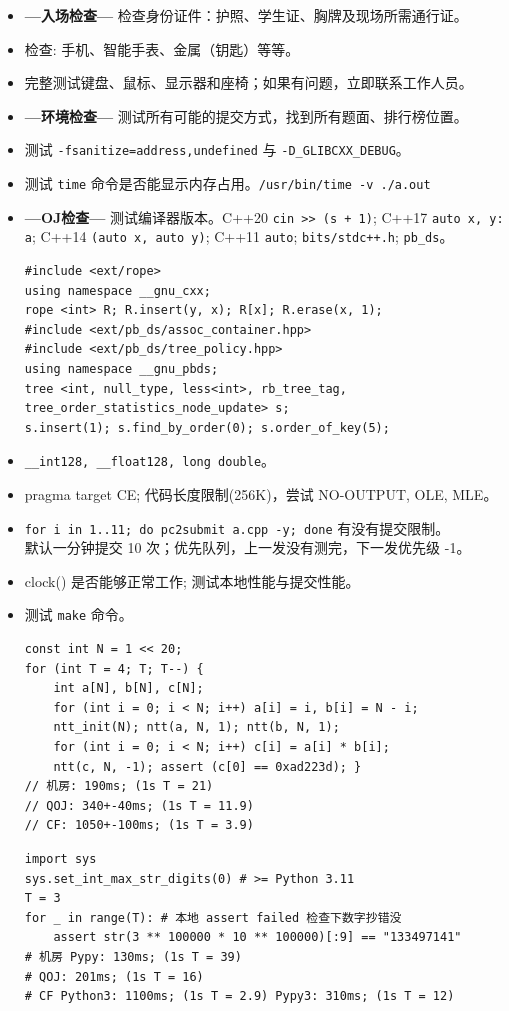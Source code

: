 \begin{itemize}[leftmargin=0.5mm]
	\setlength{\itemsep}{0pt}
	\setlength{\parskip}{0.5pt}
	\item \textbf{\large ---入场检查---} 检查身份证件：护照、学生证、胸牌及现场所需通行证。
	\item 检查: 手机、智能手表、金属（钥匙）等等。
	\item 完整测试键盘、鼠标、显示器和座椅；如果有问题，立即联系工作人员。
	\item \textbf{\large ---环境检查---} 测试所有可能的提交方式，找到所有题面、排行榜位置。
	\item 测试 \texttt{-fsanitize=address,undefined} 与 \texttt{-D\_GLIBCXX\_DEBUG}。
	\item 测试 \texttt{time} 命令是否能显示内存占用。\texttt{/usr/bin/time -v ./a.out}
	\item \textbf{\large ---OJ检查---} 测试编译器版本。C++20 \texttt{cin >> (s + 1)}; C++17 \texttt{auto \lbrack x, y\rbrack : a}; C++14 \texttt{\lbrack \rbrack (auto x, auto y)}; C++11 \texttt{auto}; \texttt{bits/stdc++.h}; \texttt{pb\_ds}。
\begin{verbatim}
#include <ext/rope>
using namespace __gnu_cxx;
rope <int> R; R.insert(y, x); R[x]; R.erase(x, 1);
#include <ext/pb_ds/assoc_container.hpp> 
#include <ext/pb_ds/tree_policy.hpp> 
using namespace __gnu_pbds;
tree <int, null_type, less<int>, rb_tree_tag,
tree_order_statistics_node_update> s;
s.insert(1); s.find_by_order(0); s.order_of_key(5);
\end{verbatim}
	\item \texttt{\_\_int128, \_\_float128, long double}。
	\item pragma target CE; 代码长度限制(256K)，尝试 NO-OUTPUT, OLE, MLE。
	\item \texttt{for i in {1..11}; do pc2submit a.cpp -y; done} 有没有提交限制。\\默认一分钟提交 10 次；优先队列，上一发没有测完，下一发优先级 -1。
	\item clock() 是否能够正常工作; 测试本地性能与提交性能。
	\item 测试 \texttt{make} 命令。
\begin{verbatim}
const int N = 1 << 20;
for (int T = 4; T; T--) {
    int a[N], b[N], c[N];
    for (int i = 0; i < N; i++) a[i] = i, b[i] = N - i;
    ntt_init(N); ntt(a, N, 1); ntt(b, N, 1);
    for (int i = 0; i < N; i++) c[i] = a[i] * b[i];
    ntt(c, N, -1); assert (c[0] == 0xad223d); }
// 机房: 190ms; (1s T = 21)
// QOJ: 340+-40ms; (1s T = 11.9)
// CF: 1050+-100ms; (1s T = 3.9)
\end{verbatim}
\begin{verbatim}
import sys
sys.set_int_max_str_digits(0) # >= Python 3.11 
T = 3
for _ in range(T): # 本地 assert failed 检查下数字抄错没
    assert str(3 ** 100000 * 10 ** 100000)[:9] == "133497141"
# 机房 Pypy: 130ms; (1s T = 39)
# QOJ: 201ms; (1s T = 16)
# CF Python3: 1100ms; (1s T = 2.9) Pypy3: 310ms; (1s T = 12)
\end{verbatim}
\end{itemize}
